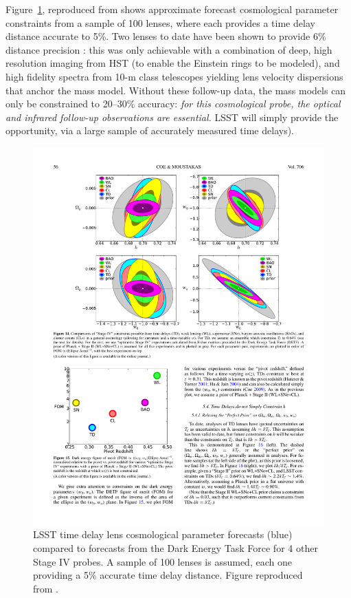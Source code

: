 Figure~\ref{fig:sl_forecast}, reproduced from \citet{Coe+Moustakas2009}
shows approximate forecast cosmological  parameter constraints from a
sample of 100 lenses, where each provides a  time delay distance
accurate to 5\%. Two lenses to date have been  shown to provide 6\%
distance precision \citep{SuyuEtal2014}: this was only  achievable with a
combination of deep, high resolution imaging from HST (to enable the
Einstein rings to be modeled), and high fidelity spectra from 10-m class
telescopes yielding lens velocity dispersions that anchor the mass
model. Without these follow-up data, the mass models can only be
constrained to 20--30\% accuracy: {\it for this cosmological probe, the
optical and infrared follow-up observations are essential.} LSST will
simply provide the opportunity, via a large sample of accurately
measured time delays).

\begin{figure}[!t]
    \centering\includegraphics[width=0.9\linewidth]{figs/Coe+Moustakas2009_Figure14.pdf}
    \caption{LSST time delay lens cosmological parameter forecasts (blue)
    compared to forecasts from the Dark
    Energy Task Force \citep{AlbrechtEtal2006} for 4 other Stage IV probes.
    A sample of 100 lenses is assumed, each one
    providing a 5\% accurate time delay distance. Figure reproduced from
    \citet{Coe+Moustakas2009}.}
    \label{fig:sl_forecast}
\end{figure}

